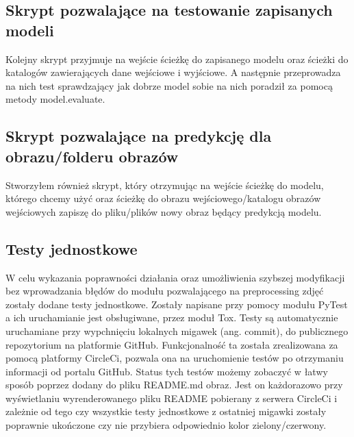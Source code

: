\documentclass{article}
\begin{document}
\subsection{Skrypt pozwalające na testowanie zapisanych modeli}
Kolejny skrypt przyjmuje na wejście ścieżkę do zapisanego modelu oraz ścieżki do katalogów zawierających dane wejściowe i wyjściowe.
A następnie przeprowadza na nich test sprawdzający jak dobrze model sobie na nich poradził za pomocą metody model.evaluate.
\subsection{Skrypt pozwalające na predykcję dla obrazu/folderu obrazów}
Stworzyłem również skrypt, który otrzymując na wejście ścieżkę do modelu, którego chcemy użyć oraz
ścieżkę do obrazu wejściowego/katalogu obrazów wejściowych zapiszę do pliku/plików nowy obraz będący predykcją modelu.
\subsection{Testy jednostkowe}
W celu wykazania poprawności działania oraz umożliwienia szybszej modyfikacji bez wprowadzania błędów do modułu pozwalającego na preprocessing zdjęć zostały dodane testy jednostkowe.
Zostały napisane przy pomocy modułu PyTest a ich uruchamianie jest obsługiwane, przez moduł Tox.
Testy są automatycznie uruchamiane przy wypchnięciu lokalnych migawek (ang. commit), do publicznego repozytorium na platformie GitHub.
Funkcjonalność ta została zrealizowana za pomocą platformy CircleCi, pozwala ona na uruchomienie testów po otrzymaniu informacji od portalu GitHub.
Status tych testów możemy zobaczyć w łatwy sposób poprzez dodany do pliku README.md obraz.
Jest on każdorazowo przy wyświetlaniu wyrenderowanego pliku README pobierany z serwera CircleCi i zależnie od tego czy wszystkie testy jednostkowe z ostatniej migawki zostały poprawnie ukończone czy nie przybiera odpowiednio kolor zielony/czerwony.
\end{document}
